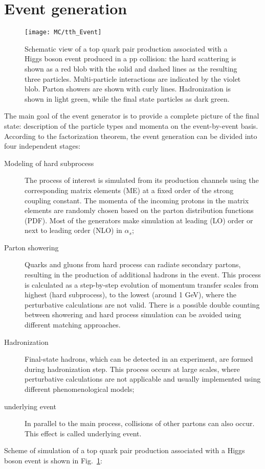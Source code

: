 \section{Event generation}

\begin{figure}[!t]
\begin{center}
\texttt{[image: MC/tth\_Event]}
\end{center}
\caption{Schematic view of a  top quark pair production associated with a Higgs boson event produced in a pp collision: the hard scattering is shown as a red blob with the solid and dashed lines as the resulting three particles.
Multi-particle interactions are indicated by the violet blob. 
Parton showers are shown with curly lines.
Hadronization is shown in light green, while the final state particles as dark green\cite{MC:ttHSketch}.
}
\label{fig:MC_ttH}
\end{figure}

The main goal of the event generator is to provide a complete picture of the final state: description of the particle types and momenta on  the event-by-event basis. According to the factorization theorem\cite{Factorisation}, the event generation can be divided into four independent stages: 
\begin{description}
\item[Modeling of hard subprocess] The process of interest is simulated from its production channels using the corresponding matrix elements (ME)  at a fixed order of the strong coupling constant. The momenta of the incoming protons in the matrix elements are randomly chosen based on the parton distribution functions (PDF). Most of the generators make simulation at leading (LO) order or next to leading order (NLO) in $\alpha_s$;
\item[Parton showering] Quarks and gluons from hard process can radiate secondary partons, resulting in the production of additional hadrons in the event. This process is calculated as a step-by-step evolution of momentum transfer scales from highest (hard subprocess), to the lowest (around 1 GeV), where the perturbative calculations are not valid. 
There is a possible double counting between showering and hard process simulation can be avoided using different matching approaches. 
\item[Hadronization] Final-state hadrons, which can be detected in an experiment, are formed during hadronization step. This process occurs at large scales, where perturbative calculations are not applicable and usually implemented using different phenomenological models\cite{hep-ph/9912292};
\item[underlying event] In parallel to the main process, collisions of other partons can also occur. This effect is called underlying event. 
\end{description}
Scheme of simulation of a top quark pair production associated with a Higgs boson event is shown in Fig.~\ref{fig:MC_ttH}:

